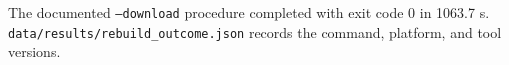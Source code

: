 The documented \texttt{--download} procedure completed with exit code 0 in 1063.7 s. \texttt{data/results/rebuild\_outcome.json} records the command, platform, and tool versions.
